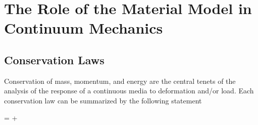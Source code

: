 \documentclass[pdf,ps2pdf,12pt,report,strict]{SANDreport/SANDreport}
\begin{document}
\section{The Role of the Material Model in Continuum Mechanics}
\label{sec:roleofmatmod}

\subsection{Conservation Laws}
Conservation of mass, momentum, and energy are the central tenets of the
analysis of the response of a continuous media to deformation and/or load.
Each conservation law can be summarized by the following statement

\begin{minipage}{\textwidth}
\begin{center}
   =
   +
\end{center}
\end{minipage}
\end{document}
